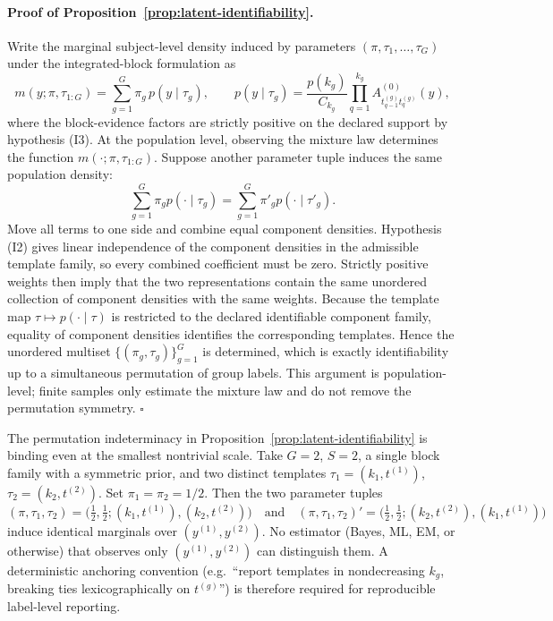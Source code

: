 \paragraph{Proof of Proposition~\ref{prop:latent-identifiability}.}
Write the marginal subject-level density induced by parameters $(\pi,\tau_1,\dots,\tau_G)$ under
the integrated-block formulation as
\[
m(y; \pi, \tau_{1:G}) = \sum_{g=1}^G \pi_g \, p(y\mid \tau_g),
\qquad
p(y\mid \tau_g) = \frac{p(k_g)}{C_{k_g}} \prod_{q=1}^{k_g} A^{(0)}_{t^{(g)}_{q-1} t^{(g)}_q}(y),
\]
where the block-evidence factors are strictly positive on the declared support by hypothesis (I3).
At the population level, observing the mixture law determines the function
$m(\cdot;\pi,\tau_{1:G})$. Suppose another parameter tuple induces the same population density:
\[
\sum_{g=1}^G \pi_g p(\cdot\mid\tau_g)
=
\sum_{g=1}^G \pi'_g p(\cdot\mid\tau'_g).
\]
Move all terms to one side and combine equal component densities. Hypothesis (I2) gives linear
independence of the component densities in the admissible template family, so every combined
coefficient must be zero. Strictly positive weights then imply that the two representations contain
the same unordered collection of component densities with the same weights. Because the template map
$\tau\mapsto p(\cdot\mid\tau)$ is restricted to the declared identifiable component family, equality
of component densities identifies the corresponding templates. Hence the unordered multiset
$\{(\pi_g,\tau_g)\}_{g=1}^G$ is determined, which is exactly identifiability up to a simultaneous
permutation of group labels. This argument is population-level; finite samples only estimate the
mixture law and do not remove the permutation symmetry. \hfill$\square$

\begin{example}
\label{ex:label-switch-counterexample}
The permutation indeterminacy in Proposition~\ref{prop:latent-identifiability} is binding even at
the smallest nontrivial scale. Take $G=2$, $S=2$, a single block family with a symmetric prior, and
two distinct templates $\tau_1=(k_1,t^{(1)})$, $\tau_2=(k_2,t^{(2)})$. Set $\pi_1=\pi_2=1/2$. Then
the two parameter tuples
\[
(\pi,\tau_1,\tau_2) = \big(\tfrac12, \tfrac12; (k_1,t^{(1)}), (k_2,t^{(2)})\big)
\quad\text{and}\quad
(\pi,\tau_1,\tau_2)' = \big(\tfrac12, \tfrac12; (k_2,t^{(2)}), (k_1,t^{(1)})\big)
\]
induce identical marginals over $(y^{(1)},y^{(2)})$. No estimator (Bayes, ML, EM, or otherwise)
that observes only $(y^{(1)},y^{(2)})$ can distinguish them. A deterministic anchoring convention
(e.g.\ ``report templates in nondecreasing $k_g$, breaking ties lexicographically on $t^{(g)}$'') is
therefore required for reproducible label-level reporting.
\end{example}

